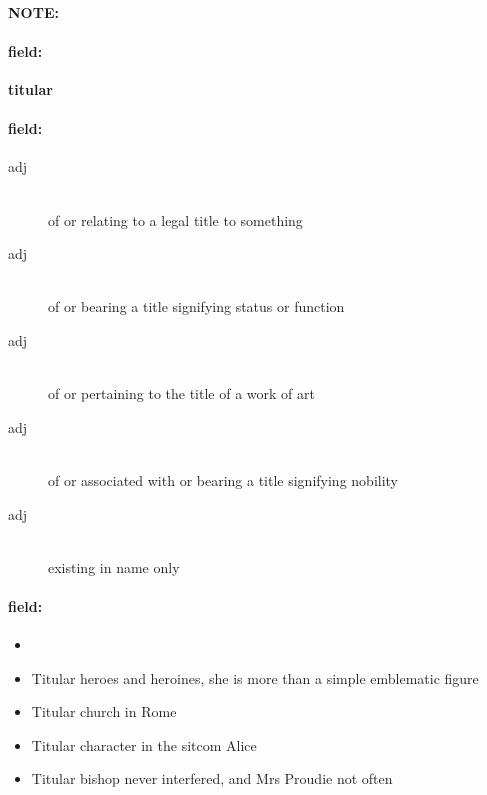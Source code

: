 \documentclass[12pt]{article}
\newenvironment{note}{\paragraph{NOTE:}}{}
\newenvironment{field}{\paragraph{field:}}{}
\begin{document}
\begin{note}
\begin{field}
\textbf{\large titular}
\end{field}


\begin{field}
\begin{description}
\item[adj] \hfill \\ 
of or relating to a legal title to something

\item[adj] \hfill \\ 
of or bearing a title signifying status or function

\item[adj] \hfill \\ 
of or pertaining to the title of a work of art

\item[adj] \hfill \\ 
of or associated with or bearing a title signifying nobility

\item[adj] \hfill \\ 
existing in name only

\end{description}
\end{field}

\begin{field}
\begin{itemize}
\item 
\item Titular heroes and heroines, she is more than a simple emblematic figure
\item Titular church in Rome
\item Titular character in the sitcom Alice
\item Titular bishop never interfered, and Mrs Proudie not often
\end{itemize}
\end{field}
\end{note}
\end{document}
